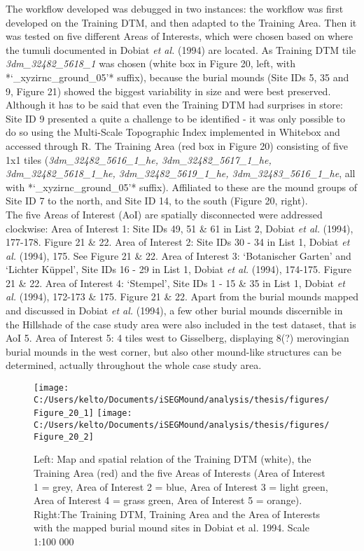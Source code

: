 \documentclass[
  12pt,
]{article}
\begin{document}
The workflow developed was debugged in two instances: the workflow was first developed on the Training DTM, and then adapted to the Training Area. Then it was tested on five different Areas of Interests, which were chosen based on where the tumuli documented in Dobiat \emph{et al.} (1994) are located.
As Training DTM tile \emph{3dm\_32482\_5618\_1} was chosen (white box in Figure 20, left, with *`\_xyzirnc\_ground\_05'* suffix), because the burial mounds (Site IDs 5, 35 and 9, Figure 21) showed the biggest variability in size and were best preserved. Although it has to be said that even the Training DTM had surprises in store: Site ID 9 presented a quite a challenge to be identified - it was only possible to do so using the Multi-Scale Topographic Index implemented in Whitebox and accessed through R.
The Training Area (red box in Figure 20) consisting of five 1x1 tiles (\emph{3dm\_32482\_5616\_1\_he, 3dm\_32482\_5617\_1\_he, 3dm\_32482\_5618\_1\_he, 3dm\_32482\_5619\_1\_he, 3dm\_32483\_5616\_1\_he}, all with *`\_xyzirnc\_ground\_05'* suffix). Affiliated to these are the mound groups of Site ID 7 to the north, and Site ID 14, to the south (Figure 20, right).\\
The five Areas of Interest (AoI) are spatially disconnected were addressed clockwise:
Area of Interest 1: Site IDs 49, 51 \& 61 in List 2, Dobiat \emph{et al.} (1994), 177-178. Figure 21 \& 22.
Area of Interest 2: Site IDs 30 - 34 in List 1, Dobiat \emph{et al.} (1994), 175. See Figure 21 \& 22.
Area of Interest 3: `Botanischer Garten' and `Lichter Küppel', Site IDs 16 - 29 in List 1, Dobiat \emph{et al.} (1994), 174-175. Figure 21 \& 22.
Area of Interest 4: `Stempel', Site IDs 1 - 15 \& 35 in List 1, Dobiat \emph{et al.} (1994), 172-173 \& 175. Figure 21 \& 22.
Apart from the burial mounds mapped and discussed in Dobiat \emph{et al.} (1994), a few other burial mounds discernible in the Hillshade of the case study area were also included in the test dataset, that is AoI 5.
Area of Interest 5: 4 tiles west to Gisselberg, displaying 8(?) merovingian burial mounds in the west corner, but also other mound-like structures can be determined, actually throughout the whole case study area.

\begin{figure}
\texttt{[image: C:/Users/kelto/Documents/iSEGMound/analysis/thesis/figures/Figure\_20\_1]} \texttt{[image: C:/Users/kelto/Documents/iSEGMound/analysis/thesis/figures/Figure\_20\_2]} \caption{Left:  Map and spatial relation of the Training DTM (white), the Training Area (red) and the five Areas of Interests (Area of Interest 1 = grey, Area of Interest 2 = blue, Area of Interest 3 = light green, Area of Interest 4 = grass green, Area of Interest 5 = orange). Right:The Training DTM, Training Area and the Area of Interests with the mapped burial mound sites in Dobiat et al. 1994. Scale 1:100 000}\label{fig:Figure20}
\end{figure}
\end{document}
